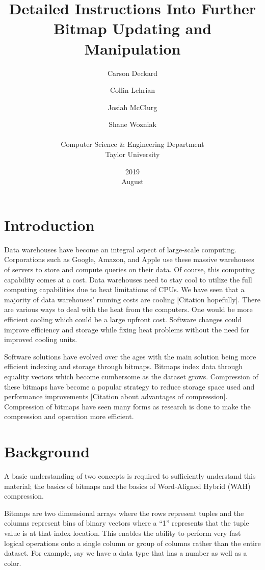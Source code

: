 \documentclass{article}
\title{Detailed Instructions Into Further Bitmap Updating and Manipulation}
\date{2019 \\ August }
\author{Carson Deckard \and Collin Lehrian \and Josiah McClurg \and Shane Wozniak \\ \\ Computer Science \&  Engineering Department \\ Taylor University}
\begin{document}
\maketitle

%
%
\section{Introduction}
\justify
Data warehouses have become an integral aspect of large-scale computing. Corporations such as Google, Amazon, and Apple use these massive warehouses of servers to store and compute queries on their data. Of course, this computing capability comes at a cost. Data warehouses need to stay cool to utilize the full computing capabilities due to heat limitations of CPUs. We have seen that a majority of data warehouses' running costs are cooling [Citation hopefully].
There are various ways to deal with the heat from the computers. One would be more efficient cooling which could be a large upfront cost. Software changes could improve efficiency and storage while fixing heat problems without the need for improved cooling units.
\par
Software solutions have evolved over the ages with the main solution being more efficient indexing and storage through bitmaps. Bitmaps index data through equality vectors which become cumbersome as the dataset grows. Compression of these bitmaps have become a popular strategy to reduce storage space used and performance improvements [Citation about advantages of compression]. Compression of bitmaps have seen many forms as research is done to make the compression and operation more efficient. 
%
%
\section{Background}
\justify

A basic understanding of two concepts is required to sufficiently understand this material; the basics of bitmaps and the basics of Word-Aligned Hybrid (WAH) compression. \par

Bitmaps are two dimensional arrays where the rows represent tuples and the columns represent bins of binary vectors where a “1” represents that the tuple value is at that index location. This enables the ability to perform very fast logical operations onto a single column or group of columns rather than the entire dataset. For example, say we have a data type that has a number as well as a color. \par
\end{document}
